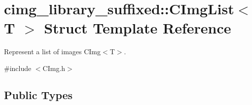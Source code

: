\hypertarget{structcimg__library__suffixed_1_1CImgList}{}\section{cimg\+\_\+library\+\_\+suffixed\+:\+:C\+Img\+List$<$ T $>$ Struct Template Reference}
\label{structcimg__library__suffixed_1_1CImgList}


Represent a list of images C\+Img$<$\+T$>$.  




{\ttfamily \#include $<$C\+Img.\+h$>$}

\subsection*{Public Types}
